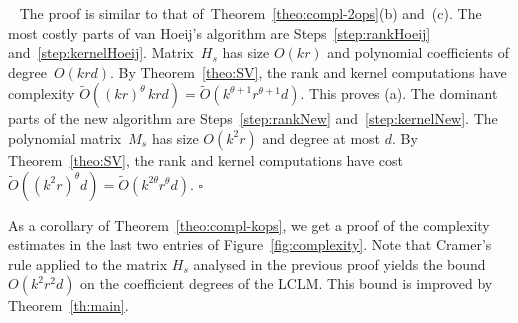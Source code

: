 \documentclass{sig-alt-full}
\def\myproof{\noindent{\sc Proof.}~}
\def\foorp{\hfill$\square$}
\newcommand{\bigOsoft}{\widetilde{{O}}}
\begin{document}
\myproof
The proof is similar to that of~Theorem~\ref{theo:compl-2ops}(b) and~(c).
The most costly parts of van Hoeij's algorithm are
Steps~\ref{step:rankHoeij} and~\ref{step:kernelHoeij}.
Matrix~$H_s$ has size $O(kr)$ and  polynomial coefficients of degree~$O(k rd)$. By Theorem~\ref{theo:SV}, the rank and kernel computations have complexity $\bigOsoft((kr)^{\theta} \, krd) = \bigOsoft(k^{\theta+1} r^{\theta+1} d)$. This proves (a).
The dominant parts of the new algorithm are
Steps~\ref{step:rankNew} and~\ref{step:kernelNew}. The polynomial matrix~$M_s$ has size $O(k^2 r)$ and degree at most $d$. By Theorem~\ref{theo:SV}, the rank and kernel computations have cost $\bigOsoft ((k^2 r)^{\theta}d) = \bigOsoft(k^{2\theta} r^\theta d)$. 
\foorp

\smallskip
As a corollary of Theorem~\ref{theo:compl-kops}, we
get a proof of the complexity estimates in the last two entries of Figure~\ref{fig:complexity}. Note that Cramer's rule applied to the matrix $H_s$ analysed in the previous proof yields the bound $O(k^2r^2d)$ on the coefficient degrees of the LCLM. This bound is improved by Theorem~\ref{th:main}.

\vspace{-0.1cm}
\end{document}
